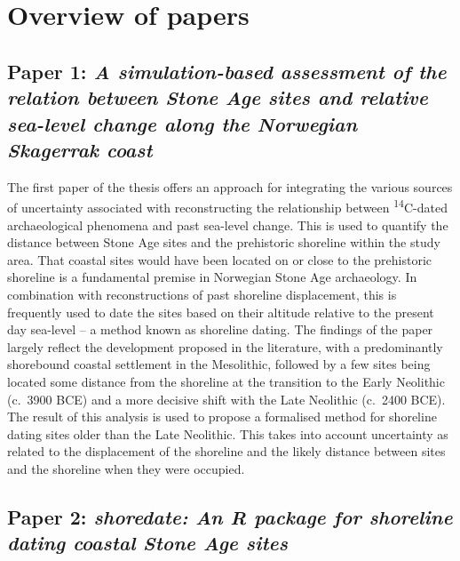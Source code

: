 \documentclass[
  12pt,
  a4paper,
  oneside]{book}
\begin{document}
\hypertarget{overview-of-papers}{%
\section{Overview of papers}\label{overview-of-papers}}

\hypertarget{paper-1-a-simulation-based-assessment-of-the-relation-between-stone-age-sites-and-relative-sea-level-change-along-the-norwegian-skagerrak-coast}{%
\subsection{\texorpdfstring{Paper 1: \emph{A simulation-based assessment of the relation between Stone Age sites and relative sea-level change along the Norwegian Skagerrak coast}}{Paper 1: A simulation-based assessment of the relation between Stone Age sites and relative sea-level change along the Norwegian Skagerrak coast}}\label{paper-1-a-simulation-based-assessment-of-the-relation-between-stone-age-sites-and-relative-sea-level-change-along-the-norwegian-skagerrak-coast}}

The first paper of the thesis offers an approach for integrating the various sources of uncertainty associated with reconstructing the relationship between \textsuperscript{14}C-dated archaeological phenomena and past sea-level change. This is used to quantify the distance between Stone Age sites and the prehistoric shoreline within the study area. That coastal sites would have been located on or close to the prehistoric shoreline is a fundamental premise in Norwegian Stone Age archaeology. In combination with reconstructions of past shoreline displacement, this is frequently used to date the sites based on their altitude relative to the present day sea-level -- a method known as shoreline dating. The findings of the paper largely reflect the development proposed in the literature, with a predominantly shorebound coastal settlement in the Mesolithic, followed by a few sites being located some distance from the shoreline at the transition to the Early Neolithic (c.~3900 BCE) and a more decisive shift with the Late Neolithic (c.~2400 BCE). The result of this analysis is used to propose a formalised method for shoreline dating sites older than the Late Neolithic. This takes into account uncertainty as related to the displacement of the shoreline and the likely distance between sites and the shoreline when they were occupied.

\hypertarget{paper-2-shoredate-an-r-package-for-shoreline-dating-coastal-stone-age-sites}{%
\subsection{\texorpdfstring{Paper 2: \emph{shoredate: An R package for shoreline dating coastal Stone Age sites}}{Paper 2: shoredate: An R package for shoreline dating coastal Stone Age sites}}\label{paper-2-shoredate-an-r-package-for-shoreline-dating-coastal-stone-age-sites}}
\end{document}
